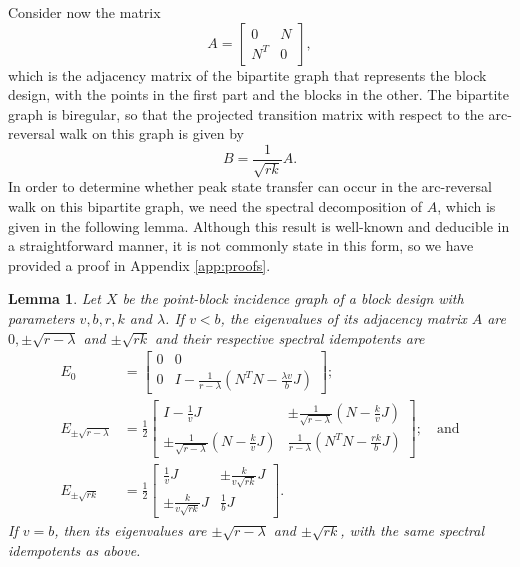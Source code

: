 \documentclass{article}
\newtheorem{lemma}[theorem]{Lemma}
\numberwithin{equation}{section}
\begin{document}
Consider now the matrix
\[
A = \begin{bmatrix}
0 & N \\
N^T & 0
\end{bmatrix},
\]
which is the adjacency matrix of the bipartite graph that represents the block design, with the points in the first part and the blocks in the other. The bipartite graph is biregular, so that the projected transition matrix with respect to the arc-reversal walk on this graph is given by
\[
B = \frac{1}{\sqrt{rk}} A.
\]
In order to determine whether peak state transfer can occur in the arc-reversal walk on this bipartite graph, we need the spectral decomposition of $A$, which is given in the following lemma. Although this result is well-known and deducible in a straightforward manner, it is not commonly state in this form, so we have provided a proof in Appendix \ref{app:proofs}.

\begin{lemma}
\label{lem:2design_idempotents}
Let $X$ be the point-block incidence graph of a block design with parameters $v,b,r,k$ and $\lambda$. If $v < b$, the eigenvalues of its adjacency matrix $A$ are $0, \pm \sqrt{r-\lambda}$ and $\pm\sqrt{rk}$ and their respective spectral idempotents are
\begin{align*}
E_{0} &= 
\begin{bmatrix}
0 & 0 \\
0 & I - \frac{1}{r-\lambda}\left(N^TN - \frac{\lambda v}{b}J\right)
\end{bmatrix}; \\
E_{\pm \sqrt{r-\lambda}} &= 
\frac{1}{2}
\begin{bmatrix}
I - \frac{1}{v}J & \pm\frac{1}{\sqrt{r-\lambda}} \left(N - \frac{k}{v}J\right)\\
\pm \frac{1}{\sqrt{r-\lambda}} \left(N - \frac{k}{v}J\right) & \frac{1}{r-\lambda}\left(N^TN - \frac{rk}{b}J\right)
\end{bmatrix}
; \quad \text{and}\\
E_{\pm \sqrt{rk}} &= \frac{1}{2}
\begin{bmatrix}
\frac{1}{v}J & \pm \frac{k}{v\sqrt{rk}} J \\
\pm \frac{k}{v\sqrt{rk}} J & \frac{1}{b}J
\end{bmatrix}.
\end{align*}
If $v = b$, then its eigenvalues are $\pm \sqrt{r-\lambda}$ and $\pm \sqrt{rk}$, with the same spectral idempotents as above.
\end{lemma}
\end{document}
